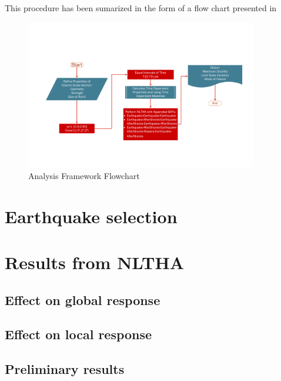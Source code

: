 This procedure has been sumarized in the form of a flow chart presented in 

\begin{figure}[htbp]
	\centering
	\includegraphics[width=0.9\textwidth]{Chapter-5/figs/AnalysisFramework_01}
	\caption{Analysis Framework Flowchart}
	\label{fig:NLTHA_Framework}
\end{figure}

\section{Earthquake selection}
\lipsum[4]
\section{Results from NLTHA}
\lipsum[5]
\subsection{Effect on global response}
\lipsum[6]
\subsection{Effect on local response}
\lipsum[7]
\subsection{Preliminary results}
\lipsum[8]
